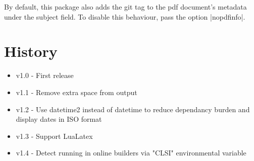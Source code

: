 \documentclass[a4paper]{ltxdoc}
\begin{document}
 By default, this package also adds the git tag to the
pdf document's metadata under the subject field. To disable this behaviour, pass
the option |nopdfinfo|. 


\section{History}

\begin{itemize}
	\item v1.0 - First release
	\item v1.1 - Remove extra space from output
	\item v1.2 - Use datetime2 instead of datetime to reduce dependancy burden
   				 and display dates in ISO format
   	\item v1.3 - Support LuaLatex
	\item v1.4 - Detect running in online builders via "CLSI" environmental variable
\end{itemize}
\end{document}
